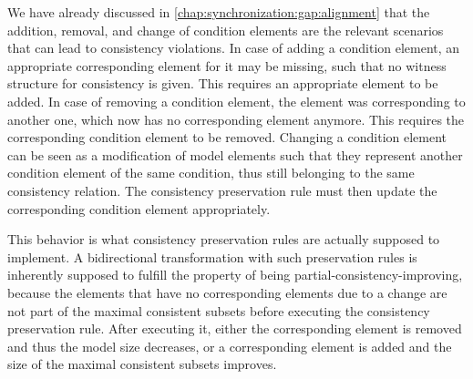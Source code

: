 We have already discussed in \autoref{chap:synchronization:gap:alignment} that the addition, removal, and change of condition elements are the relevant scenarios that can lead to consistency violations.
In case of adding a condition element, an appropriate corresponding element for it may be missing, such that no witness structure for consistency is given.
This requires an appropriate element to be added.
In case of removing a condition element, the element was corresponding to another one, which now has no corresponding element anymore.
This requires the corresponding condition element to be removed.
Changing a condition element can be seen as a modification of model elements such that they represent another condition element of the same condition, thus still belonging to the same consistency relation.
The consistency preservation rule must then update the corresponding condition element appropriately.

This behavior is what consistency preservation rules are actually supposed to implement.
A bidirectional transformation with such preservation rules is inherently supposed to fulfill the property of being partial-consistency-improving, because the elements that have no corresponding elements due to a change are not part of the maximal consistent subsets before executing the consistency preservation rule.
After executing it, either the corresponding element is removed and thus the model size decreases, or a corresponding element is added and the size of the maximal consistent subsets improves.

